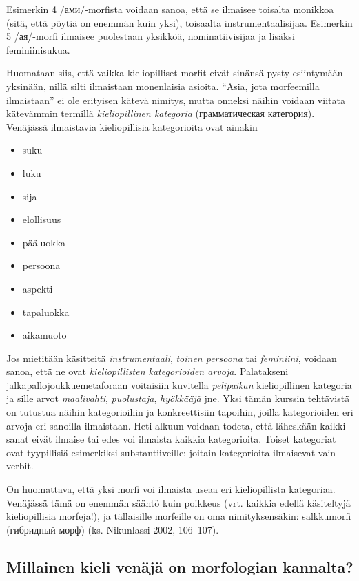 Esimerkin 4 /ами/-morfista voidaan sanoa, että se ilmaisee toisalta
monikkoa (sitä, että pöytiä on enemmän kuin yksi), toisaalta
instrumentaalisijaa. Esimerkin 5 /ая/-morfi ilmaisee puolestaan
yksikköä, nominatiivisijaa ja lisäksi feminiinisukua.

Huomataan siis, että vaikka kieliopilliset morfit eivät sinänsä pysty
esiintymään yksinään, nillä silti ilmaistaan monenlaisia asioita.
``Asia, jota morfeemilla ilmaistaan'' ei ole erityisen kätevä nimitys,
mutta onneksi näihin voidaan viitata kätevämmin termillä
\emph{kieliopillinen kategoria} (грамматическая категория). Venäjässä
ilmaistavia kieliopillisia kategorioita ovat ainakin

\begin{itemize}
\itemsep1pt\parskip0pt
\item
  suku
\item
  luku
\item
  sija
\item
  elollisuus
\item
  pääluokka
\item
  persoona
\item
  aspekti
\item
  tapaluokka
\item
  aikamuoto
\end{itemize}

Jos mietitään käsitteitä \emph{instrumentaali}, \emph{toinen persoona}
tai \emph{feminiini}, voidaan sanoa, että ne ovat \emph{kieliopillisten
kategorioiden arvoja}. Palatakseni jalkapallojoukkuemetaforaan
voitaisiin kuvitella \emph{pelipaikan} kieliopillinen kategoria ja sille
arvot \emph{maalivahti}, \emph{puolustaja}, \emph{hyökkääjä} jne. Yksi
tämän kurssin tehtävistä on tutustua näihin kategorioihin ja
konkreettisiin tapoihin, joilla kategorioiden eri arvoja eri sanoilla
ilmaistaan. Heti alkuun voidaan todeta, että läheskään kaikki sanat
eivät ilmaise tai edes voi ilmaista kaikkia kategorioita. Toiset
kategoriat ovat tyypillisiä esimerkiksi substantiiveille; joitain
kategorioita ilmaisevat vain verbit.

On huomattava, että yksi morfi voi ilmaista useaa eri kieliopillista
kategoriaa. Venäjässä tämä on enemmän sääntö kuin poikkeus (vrt. kaikkia
edellä käsiteltyjä kieliopillisia morfeja!), ja tällaisille morfeille on
oma nimityksensäkin: salkkumorfi (гибридный морф) (ks. Nikunlassi 2002,
106--107).

\subsection{Millainen kieli venäjä on morfologian
kannalta?}\label{millainen-kieli-venuxe4juxe4-on-morfologian-kannalta}

